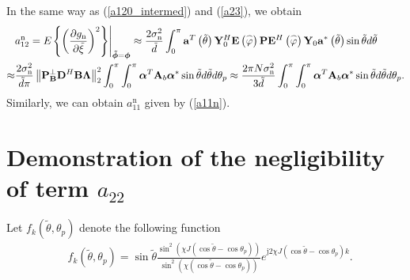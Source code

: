 \documentclass[12pt, draftclsnofoot, onecolumn]{IEEEtran}
\begin{document}
In the same way as (\ref{a120_intermed}) and (\ref{a23}), we obtain
\begin{align}%
 & a_{12}^{\mathrm{n}} = E{{\left. \left\{ {{\left( \frac{\partial {g_{\mathrm{n}}}}{\partial \tilde{\xi }} \right)}^{2}} \right\} \right|}_{\boldsymbol{\tilde{\phi}} = \boldsymbol{\phi} }}
\approx \frac{2\sigma _{\mathrm{n}}^{2}}{\tilde{d}}\int_{0}^{ \rm{\pi} } {{\mathbf{a}}^{T}}\left( {\tilde{\theta }} \right)\mathbf{Y}_{0}^{H}\mathbf{E}\left( {\overset{\scriptscriptstyle\frown}{\varphi }} \right)\mathbf{P} {{\mathbf{E}}^{H}}\left( {\overset{\scriptscriptstyle\frown}{\varphi }} \right){{\mathbf{Y}}_{0}}{{\mathbf{a}}^{*}}\left( {\tilde{\theta }} \right)\sin \tilde{\theta }d\tilde{\theta } \nonumber \\
\approx & \frac{2\sigma _{\mathrm{n}}^{2}}{\tilde{d}{\rm{\pi}} }\left\| \mathbf{P}_{\mathbf{B}}^{\bot }{{\mathbf{D}}^{H}}\mathbf{B\Lambda} \right\|_{2}^{2} \int_{0}^{ \rm{\pi} }{\int_{0}^{ \rm{\pi} } {{{\boldsymbol{\alpha }}^{T}}{{\mathbf{A}}_{b}}{{\boldsymbol{\alpha }}^{*}}\sin \tilde{\theta } d\tilde{\theta }}d{{\theta }_{p}}} \approx \frac{2{\rm{\pi}}N \sigma_{\mathrm{n}}^{2}}{3\tilde{d}} \int_{0}^{ \rm{\pi} }{\int_{0}^{ \rm{\pi} } {{{\boldsymbol{\alpha }}^{T}}{{\mathbf{A}}_{b}}{{\boldsymbol{\alpha }}^{*}}\sin \tilde{\theta } d\tilde{\theta }}d{{\theta }_{p}}}.
\end{align}
Similarly, we can obtain $a_{11}^{\mathrm{n}}$ given by (\ref{a11n}).

\vspace{-0.6em}
\section{Demonstration of the negligibility of term $a_{22}$}{\label{CrossTerm}}
Let ${f_k}\left( \tilde{\theta },{{\theta }_{p}} \right)$ denote the following function
\begin{align}
& {f_k}\left( \tilde{\theta },{{\theta }_{p}} \right) = \sin \tilde{\theta }\frac{{{\sin }^{2}}\left( \chi J\left( \cos \tilde{\theta }-\cos {{\theta }_{p}} \right) \right)}{{{\sin }^{2}}\left( \chi \left( \cos \tilde{\theta }-\cos {{\theta }_{p}} \right) \right)}{{e}^{\text{j}2\chi J\left( \cos \tilde{\theta }-\cos {{\theta }_{p}} \right)k}}.
\end{align}
\end{document}
